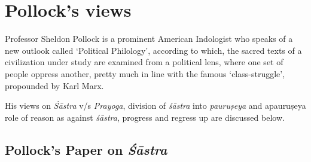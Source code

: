 \vskip -1.3cm

\section{Pollock's views}\label{art12-sec3}

Professor Sheldon Pollock is a prominent American Indologist who speaks of a new outlook called `Political Philology', according to which, the sacred texts of a civilization under study are examined from a political lens, where one set of people oppress another, pretty much in line with the famous `class-struggle', propounded by Karl Marx. 

His views on {\sl Śāstra} v/s {\sl Prayoga}, division of {\sl śāstra} into {\sl pauruṣeya} and {apauruṣeya} role of reason as against {\sl śāstra}, progress and regress up are discussed below.



\subsection{Pollock's Paper on {{\sl\bfseries Śāstra}\relax}}\label{art12-sec3.1}

